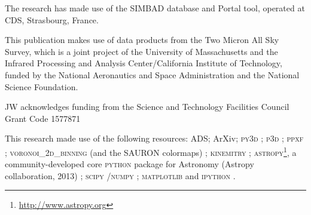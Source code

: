 \begin{originality}%
The research has made use of the SIMBAD database and Portal tool, operated at CDS, Strasbourg, France. 

This publication makes use of data products from the Two Micron All Sky Survey, which is a joint project of the University of Massachusetts and the Infrared Processing and Analysis Center/California Institute of Technology, funded by the National Aeronautics and Space Administration and the National Science Foundation.



JW acknowledges funding from the Science and Technology Facilities Council Grant Code 1577871

This research made use of the following resources: ADS; ArXiv; \textsc{py3d} \citep{Sanchez2011, Husemann2013, Husemann2014}; \textsc{p3d} \citep{Sandin2010, Sandin2011}; \textsc{ppxf} \citep{Cappellari2004}; \textsc{voronoi\_2d\_binning} (and the SAURON colormaps) \citep{Cappellari2003}; \textsc{kinemitry} \citep{Krajnovi2006}; \textsc{astropy}\footnote{\url{http://www.astropy.org}}, a community-developed core \textsc{python} package for Astronomy (Astropy collaboration, 2013) \citep{TheAstropyCollaboration2013}; \textsc{scipy} \citep{Oliphant2007, Millman2011}/\textsc{numpy} \citep{VanderWalt2011}; \textsc{matplotlib} \citep{Hunter2007} and \textsc{ipython} \citep{Perez2007}. %

\end{originality}%